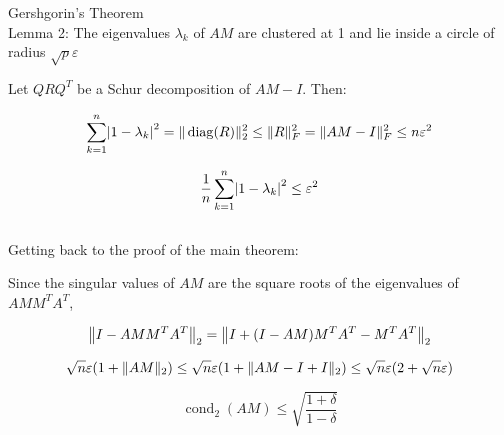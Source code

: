 \documentclass[paper=A4, fontsize=11pt]{scrartcl}
\let\originalleft\left
\let\originalright\right
\renewcommand{\left}{\mathopen{}\mathclose\bgroup\originalleft}
\renewcommand{\right}{\aftergroup\egroup\originalright}
\begin{document}
Gershgorin's Theorem \\


Lemma 2:
The eigenvalues $\lambda_k$ of $AM$ are clustered at 1 and lie inside a circle of radius $\sqrt{p} \varepsilon$

Let $Q R Q^{T}$ be a Schur decomposition of $A M-I$. Then:

\begin{equation}
\sum_{k=1}^{n}\left|1-\lambda_{k}\right|^{2}=\|\operatorname{diag}(R)\|_{2}^{2} \leq\|R\|_{F}^{2}=\|A M-I\|_{F}^{2} \leq n \varepsilon^{2}
\end{equation}

\begin{equation}
\frac{1}{n} \sum_{k=1}^{n}\left|1-\lambda_{k}\right|^{2} \leq \varepsilon^{2}
\end{equation}
\\

Getting back to the proof of the main theorem:

 Since the singular values of $AM$ are the square roots of the eigenvalues of $A M M^{T} A^{T} $, 

\begin{equation}
\left\|I-A M M^{T} A^{T}\right\|_{2}=\left\|I+(I-A M) M^{T} A^{T}-M^{T} A^{T}\right\|_{2}
\end{equation}

\begin{equation}
\sqrt{n} \varepsilon\left(1+\|A M\|_{2}\right) \leq \sqrt{n} \varepsilon\left(1+\|A M-I+I\|_{2}\right) \leq \sqrt{n} \varepsilon(2+\sqrt{n} \varepsilon)
\end{equation}

\begin{equation}
\operatorname{cond}_{2}(A M) \leq \sqrt{\frac{1+\delta}{1-\delta}}
\end{equation}
\end{document}
